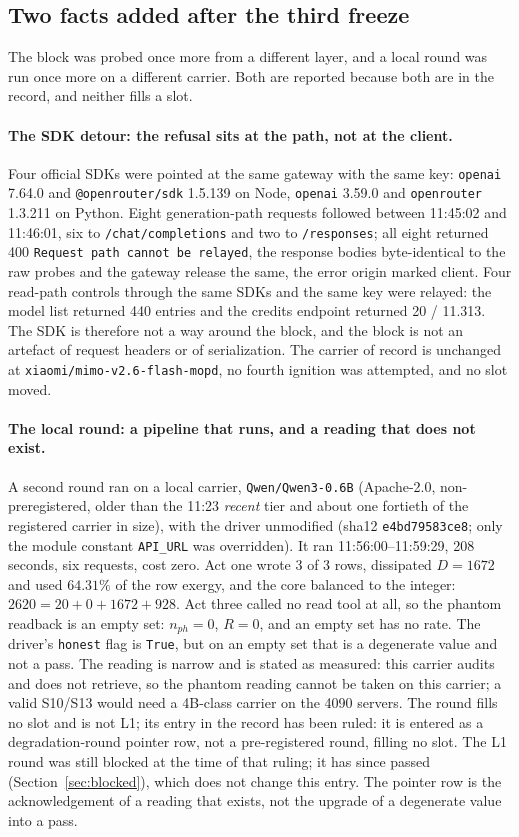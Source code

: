 \documentclass[11pt,a4paper]{article}
\begin{document}
\subsection{Two facts added after the third freeze}
\label{sec:twofacts}
The block was probed once more from a different layer, and a local round was run once more on a different carrier. Both are reported because both are in the record, and neither fills a slot.

\paragraph{The SDK detour: the refusal sits at the path, not at the client.}
Four official SDKs were pointed at the same gateway with the same key: \texttt{openai} 7.64.0 and \texttt{@openrouter/sdk} 1.5.139 on Node, \texttt{openai} 3.59.0 and \texttt{openrouter} 1.3.211 on Python. Eight generation-path requests followed between 11:45:02 and 11:46:01, six to \texttt{/chat/completions} and two to \texttt{/responses}; all eight returned 400 \texttt{Request path cannot be relayed}, the response bodies byte-identical to the raw probes and the gateway release the same, the error origin marked client. Four read-path controls through the same SDKs and the same key were relayed: the model list returned 440 entries and the credits endpoint returned 20 / 11.313. The SDK is therefore not a way around the block, and the block is not an artefact of request headers or of serialization. The carrier of record is unchanged at \texttt{xiaomi/mimo-v2.6-flash-mopd}, no fourth ignition was attempted, and no slot moved.

\paragraph{The local round: a pipeline that runs, and a reading that does not exist.}
A second round ran on a local carrier, \texttt{Qwen/Qwen3-0.6B} (Apache-2.0, non-preregistered, older than the 11:23 \emph{recent} tier and about one fortieth of the registered carrier in size), with the driver unmodified (sha12 \texttt{e4bd79583ce8}; only the module constant \texttt{API\_URL} was overridden). It ran 11:56:00--11:59:29, 208 seconds, six requests, cost zero. Act one wrote 3 of 3 rows, dissipated $D = 1672$ and used $64.31\%$ of the row exergy, and the core balanced to the integer: $2620 = 20 + 0 + 1672 + 928$. Act three called no read tool at all, so the phantom readback is an empty set: $n_{ph} = 0$, $R = 0$, and an empty set has no rate. The driver's \texttt{honest} flag is \texttt{True}, but on an empty set that is a degenerate value and not a pass. The reading is narrow and is stated as measured: this carrier audits and does not retrieve, so the phantom reading cannot be taken on this carrier; a valid S10/S13 would need a 4B-class carrier on the 4090 servers. The round fills no slot and is not L1; its entry in the record has been ruled: it is entered as a degradation-round pointer row, not a pre-registered round, filling no slot. The L1 round was still blocked at the time of that ruling; it has since passed (Section~\ref{sec:blocked}), which does not change this entry. The pointer row is the acknowledgement of a reading that exists, not the upgrade of a degenerate value into a pass.
\end{document}
